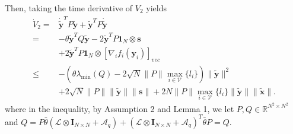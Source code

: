 \documentclass[lettersize,journal]{IEEEtran}
\begin{document}
Then, taking the time derivative of $V_2$ yields
\begin{equation}
    \begin{aligned}
        \dot{V}_{2}= & \dot{\tilde{\mathbf{y}}}^{T}P\tilde{\mathbf{y}}+\tilde{\mathbf{y}}^{T}P\dot{\tilde{\mathbf{y}}}                                         \\
        =            & -\theta\tilde{\mathbf{y}}^TQ\tilde{\mathbf{y}}-2\tilde{\mathbf{y}}^TP\mathbf{1}_N\otimes\mathbf{s}                                      \\
                     & +2\tilde{\mathbf{y}}^TP\mathbf{1}_N\otimes[\nabla_if_i(\mathbf{y}_i)]_{vec}                                                             \\
        \leq         & -(\theta\lambda_{\min}(Q)-2\sqrt{N}\|P\|\max_{i\in\mathcal{V}}\{l_{i}\})\|\tilde{\mathbf{y}}\|^{2}                                      \\
                     & +2\sqrt{N}\|P\|\|\tilde{\mathbf{y}}\|\|\mathbf{s}\|+2N\|P\|\max_{i\in\mathcal{V}}\{l_{i}\}\|\tilde{\mathbf{y}}\|\|\tilde{\mathbf{x}}\|.
    \end{aligned}
\end{equation}
where in the inequality, by Assumption 2 and Lemma 1, we let $P,Q\in\mathbb{R}^{N^{2}\times N^{2}}$ and $Q = P\bar{\theta}(\mathcal{L}\otimes\mathbf{I}_{N\times N}+\mathcal{A}_q)+(\mathcal{L}\otimes\mathbf{I}_{N\times N}+\mathcal{A}_q)^T\bar{\theta}P=Q$.
\end{document}
